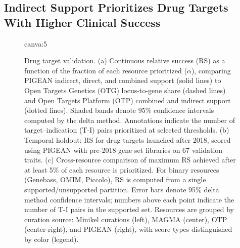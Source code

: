 \subsection{Indirect Support Prioritizes Drug Targets With Higher Clinical Success}


\begin{figure}[t!]
    \centering
    {{canva:5}}
    \caption{Drug target validation. (a) Continuous relative success (RS) as a function of the fraction of each resource prioritized ($\alpha$), comparing PIGEAN indirect, direct, and combined support (solid lines) to Open Targets Genetics (OTG) locus-to-gene share (dashed lines) and Open Targets Platform (OTP) combined and indirect support (dotted lines). Shaded bands denote 95\% confidence intervals computed by the delta method. Annotations indicate the number of target--indication (T-I) pairs prioritized at selected thresholds. (b) Temporal holdout: RS for drug targets launched after 2018, scored using PIGEAN with pre-2018 gene set libraries on 67 validation traits. (c) Cross-resource comparison of maximum RS achieved after at least 5\% of each resource is prioritized. For binary resources (Genebass, OMIM, Piccolo), RS is computed from a single supported/unsupported partition. Error bars denote 95\% delta method confidence intervals; numbers above each point indicate the number of T-I pairs in the supported set. Resources are grouped by curation source: Minikel curations (left), MAGMA (center), OTP (center-right), and PIGEAN (right), with score types distinguished by color (legend).}
    \label{fig:validation-pharma}
\end{figure}

